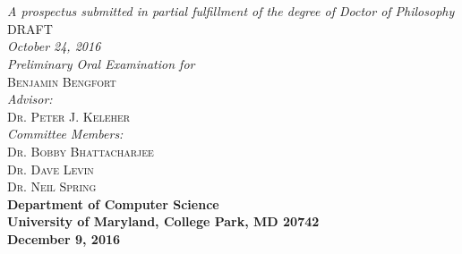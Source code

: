 \documentclass{article}
\begin{document}
\begin{titlepage}
\begin{center}

\textsc{\huge \bfseries {}}\\
\textsc{\huge \bfseries {}}\\[1.0cm]

\emph{A prospectus submitted in partial fulfillment of the degree of Doctor of
Philosophy}\\[5.5cm]

\textsc{\large DRAFT}\\
\emph{October 24, 2016}\\[2.0cm]

\emph{Preliminary Oral Examination for}\\
\textsc{\large Benjamin Bengfort}\\[2.0cm] %
\emph{Advisor:} \\
\textsc{Dr. Peter J. Keleher}\\[.5cm]
\emph{Committee Members:}\\
\textsc{Dr. Bobby Bhattacharjee}\\
\textsc{Dr. Dave Levin}\\
\textsc{Dr. Neil Spring}\\[4.0cm]

{\bfseries Department of Computer Science}\\
{\bfseries University of Maryland, College Park, MD 20742}\\
{\bfseries December 9, 2016}
\vfill

\end{center}

\end{titlepage}

\newpage
\thispagestyle{empty}
\mbox{}
\end{document}
